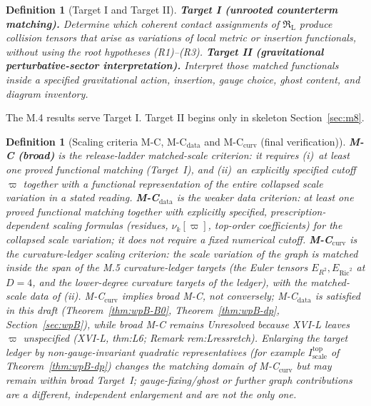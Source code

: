 \documentclass{article}
\newtheorem{definition}[proposition]{Definition}
\theoremstyle{remark}
\newcommand{\RL}{\mathfrak R_{\mathrm L}}
\begin{document}
\begin{definition}[Target I and Target II]
\label{def:targets}
\textbf{Target I (unrooted counterterm matching).} Determine which coherent contact assignments of $\RL$ produce collision tensors that arise as variations of local metric or insertion functionals, without using the root hypotheses (R1)--(R3).
\textbf{Target II (gravitational perturbative-sector interpretation).} Interpret those matched functionals inside a specified gravitational action, insertion, gauge choice, ghost content, and diagram inventory.
\end{definition}
The M.4 results serve Target I.
Target II begins only in skeleton Section~\ref{sec:m8}.

\begin{definition}[Scaling criteria M-C, M-C$_{\mathrm{data}}$ and M-C$_{\mathrm{curv}}$ (final verification)]
\label{def:MCcurv}
\textbf{M-C (broad)} is the release-ladder \emph{matched-scale} criterion: it requires
(i)~at least one proved functional matching (Target~I), and
(ii)~an explicitly specified cutoff $\varpi$ together with a functional representation of the \emph{entire} collapsed scale variation in a stated reading.
\textbf{M-C$_{\mathrm{data}}$} is the weaker \emph{data} criterion: at least one proved functional matching together with explicitly specified, prescription-dependent scaling formulas (residues, $\nu_k[\varpi]$, top-order coefficients) for the collapsed scale variation; it does not require a fixed numerical cutoff.
\textbf{M-C$_{\mathrm{curv}}$} is the \emph{curvature-ledger scaling criterion}: the scale variation of the graph is matched inside the span of the M.5 curvature-ledger targets (the Euler tensors $E_{R^2},E_{\mathrm{Ric}^2}$ at $D=4$, and the lower-degree curvature targets of the ledger), with the matched-scale data of (ii).
M-C$_{\mathrm{curv}}$ implies broad M-C, not conversely; M-C$_{\mathrm{data}}$ is satisfied in this draft (Theorem~\ref{thm:wpB-B0}, Theorem~\ref{thm:wpB-dp}, Section~\ref{sec:wpB}), while broad M-C remains Unresolved because XVI-L leaves $\varpi$ unspecified (XVI-L, thm:L6; Remark rem:Lressretch).
Enlarging the target ledger by non-gauge-invariant quadratic representatives (for example $I^{\mathrm{top}}_{\mathrm{scale}}$ of Theorem~\ref{thm:wpB-dp}) changes the matching domain of M-C$_{\mathrm{curv}}$ but may remain within broad Target~I; gauge-fixing/ghost or further graph contributions are a different, independent enlargement and are not the only one.
\end{definition}
\end{document}
